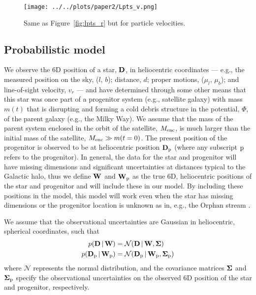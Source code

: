 \documentclass[letterpaper,12pt,preprint]{aastex}
\newcommand{\given}{\,|\,}
\newcommand{\D}{{\bf D}}
\newcommand{\W}{{\bf W}}
\newcommand{\bSigma}{{\bf \Sigma}}
\newcommand{\sat}{{\rm p}}
\begin{document}
\begin{figure}[h]
\begin{center}
\texttt{[image: ../../plots/paper2/Lpts\_v.png]}
\caption{ Same as Figure~\ref{fig:lpts_r} but for particle velocities. }\label{fig:lpts_v}
\end{center}
\end{figure}


\subsection{Probabilistic model}
We observe the 6D position of a star, $\D$, in heliocentric coordinates --- e.g., the measured position on the sky, ($l$, $b$); distance, $d$; proper motions, ($\mu_l$, $\mu_b$); and line-of-sight velocity, $v_r$ --- and have determined through some other means that this star was once part of a progenitor system (e.g., satellite galaxy) with mass $m(t)$ that is disrupting and forming a cold debris structure in the potential, $\Phi$, of the parent galaxy (e.g., the Milky Way). We assume that the mass of the parent system enclosed in the orbit of the satellite, $M_{\rm enc}$, is much larger than the initial mass of the satellite, $M_{\rm enc} \gg m(t=0)$. The present position of the progenitor is observed to be at heliocentric position $\D_\sat$ (where any subscript $\sat$ refers to the progenitor). In general, the data for the star and progenitor will have missing dimensions and significant uncertainties at distances typical to the Galactic halo, thus we define $\W$ and $\W_\sat$ as the true 6D, heliocentric positions of the star and progenitor and will include these in our model. By including these positions in the model, this model will work even when the star has missing dimensions or the progenitor location is unknown as in, e.g., the Orphan stream \citep{some orphan paper}.

We assume that the observational uncertainties are Gaussian in heliocentric, spherical coordinates, such that
\begin{align}
	p(\D \given \W) &= \mathcal{N}(\D \given \W, \bSigma)\label{eq:obsstar}\\
	p(\D_\sat \given \W_\sat) &= \mathcal{N}(\D_\sat \given \W_\sat, \bSigma_\sat)\label{eq:obsprog}
\end{align}
where $\mathcal{N}$ represents the normal distribution, and the covariance matrices $\bSigma$ and $\bSigma_\sat$ specify the observational uncertainties on the observed 6D position of the star and progenitor, respectively. 
\end{document}
